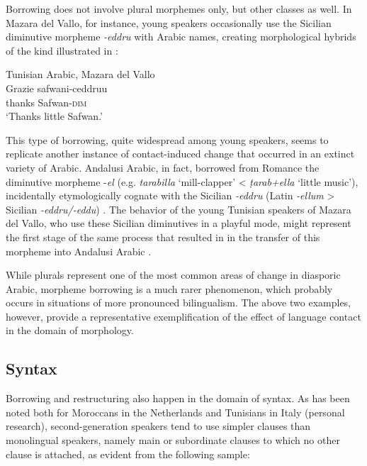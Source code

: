 \documentclass[output=paper]{langsci/langscibook}
\begin{document}
Borrowing does not involve plural morphemes only, but other classes as well. In Mazara del Vallo, for instance, young speakers occasionally use the Sicilian diminutive morpheme \textit{{}-eddru} with Arabic names, creating morphological hybrids of the kind illustrated in   : 

\ea\label{ex:key:maz1}
{Tunisian Arabic, Mazara del Vallo \citep[107]{Danna2017book}}\\
\gll Grazie safwani-ceddruu\footnotemark\\
     thanks Safwan-\textsc{dim}\\
\glt `Thanks little Safwan.'
\z

This type of borrowing, quite widespread among young speakers, seems to replicate another instance of contact-induced change that occurred in an extinct variety of Arabic. Andalusi Arabic, in fact, borrowed from Romance the diminutive morpheme -\textit{el} (e.g. \textit{tarabilla} ‘mill-clapper’ < \textit{ṭarab+ella} ‘little music’), incidentally etymologically cognate with the Sicilian \textit{{}-eddru} (Latin \textit{-ellum} > Sicilian \textit{-eddru/-eddu}) \citep[60]{Andalusi2013}. The behavior of the young Tunisian speakers of Mazara del Vallo, who use these Sicilian diminutives in a playful mode, might represent the first stage of the same process that resulted in in the transfer of this morpheme into Andalusi Arabic \citep[108]{Danna2017book}.

While plurals represent one of the most common areas of change in diasporic Arabic, morpheme borrowing is a much rarer phenomenon, which probably occurs in situations of more pronounced bilingualism. The above two examples, however, provide a representative exemplification of the effect of language contact in the domain of morphology.


 
 \subsection{Syntax}


Borrowing and restructuring also happen in the domain of syntax. As has been noted both for Moroccans in the Netherlands \citep[99]{deRuiter1989} and Tunisians in Italy (personal research), second-generation speakers tend to use simpler clauses than monolingual speakers, namely main or subordinate clauses to which no other clause is attached, as evident from the following sample:
\end{document}
